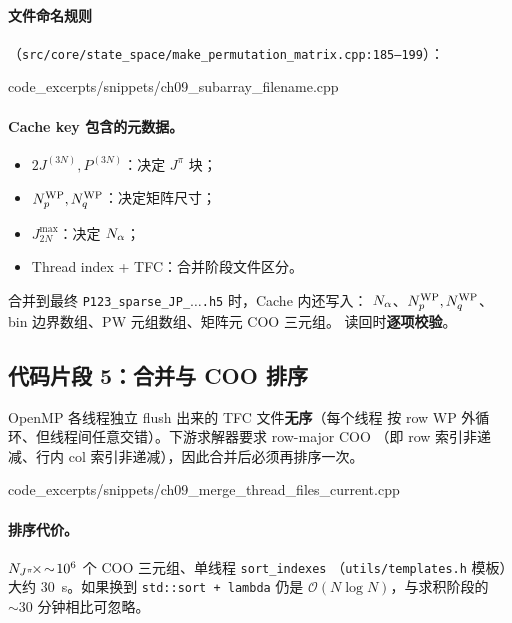 \paragraph{文件命名规则}（\texttt{src/core/state\_space/make\_permutation\_matrix.cpp:185--199}）：


{code_excerpts/snippets/ch09_subarray_filename.cpp}

\paragraph{Cache key 包含的元数据。}
\begin{itemize}
\item \(2J^{(3N)}, P^{(3N)}\)：决定 \(J^\pi\) 块；
\item \({N_{p}^{\text{WP}}}, {N_{q}^{\text{WP}}}\)：决定矩阵尺寸；
\item \(J_{2N}^{\max}\)：决定 \(N_\alpha\)；
\item Thread index + TFC：合并阶段文件区分。
\end{itemize}

合并到最终 \texttt{P123\_sparse\_JP\_$\dots$.h5} 时，Cache 内还写入：
\(N_\alpha\)、\({N_{p}^{\text{WP}}}, {N_{q}^{\text{WP}}}\)、bin 边界数组、PW 元组数组、矩阵元 COO 三元组。
读回时\textbf{逐项校验}。

\subsection{代码片段 5：合并与 COO 排序}
\label{subsec:ch09-code-merge}

OpenMP 各线程独立 flush 出来的 TFC 文件\textbf{无序}（每个线程
按 row WP 外循环、但线程间任意交错）。下游求解器要求 row-major COO
（即 row 索引非递减、行内 col 索引非递减），因此合并后必须再排序一次。


{code_excerpts/snippets/ch09_merge_thread_files_current.cpp}

\paragraph{排序代价。}
\(N_{J^\pi}\!\times\!\sim\!10^6\) 个 COO 三元组、单线程 \texttt{sort\_indexes}
（\texttt{utils/templates.h} 模板）大约 \SI{30}{\second}。如果换到
\texttt{std::sort + lambda} 仍是 \(\mathcal{O}(N\log N)\)，与求积阶段的
\(\sim 30\) 分钟相比可忽略。

